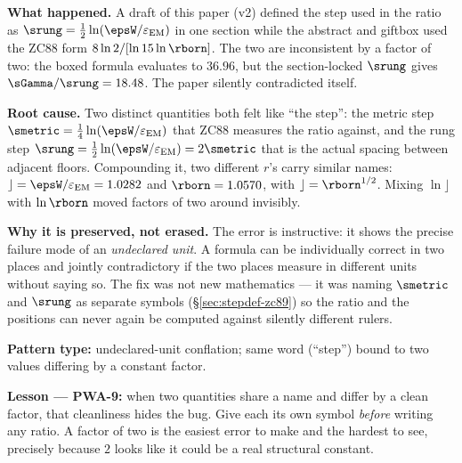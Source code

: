 \documentclass[12pt, a4paper]{article}
\renewcommand{\epsEM}{\varepsilon_{\rm EM}}     %
\begin{document}
\begin{derivedbox}[title={PM-ZC89-FACTOR2-01: The Factor-of-Two
  Unit Conflation --- Caught in Review}]
\textbf{What happened.}
A draft of this paper (v2) defined the step used in the ratio as
$\srung=\tfrac12\ln(\epsW/\epsEM)$ in one section while the abstract and
giftbox used the ZC88 form $8\ln2/[\ln15\ln\rborn]$. The two are
inconsistent by a factor of two: the boxed formula evaluates to $36.96$,
but the section-locked $\srung$ gives $\sGamma/\srung=18.48$. The paper
silently contradicted itself.

\textbf{Root cause.}
Two distinct quantities both felt like ``the step'': the metric step
$\smetric=\tfrac14\ln(\epsW/\epsEM)$ that ZC88 measures the ratio against,
and the rung step $\srung=\tfrac12\ln(\epsW/\epsEM)=2\smetric$ that is the
actual spacing between adjacent floors. Compounding it, two different
$r$'s carry similar names: $\rfloor=\epsW/\epsEM=1.0282$ and
$\rborn=1.0570$, with $\rfloor=\rborn^{1/2}$. Mixing $\ln\rfloor$ with
$\ln\rborn$ moved factors of two around invisibly.

\textbf{Why it is preserved, not erased.}
The error is instructive: it shows the precise failure mode of an
\emph{undeclared unit}. A formula can be individually correct in two places
and jointly contradictory if the two places measure in different units
without saying so. The fix was not new mathematics --- it was naming
$\smetric$ and $\srung$ as separate symbols (\S\ref{sec:stepdef-zc89}) so the
ratio and the positions can never again be computed against silently
different rulers.

\textbf{Pattern type:} undeclared-unit conflation; same word (``step'')
bound to two values differing by a constant factor.

\textbf{Lesson --- PWA-9:} when two quantities share a name and differ by a
clean factor, that cleanliness hides the bug. Give each its own symbol
\emph{before} writing any ratio. A factor of two is the easiest error to
make and the hardest to see, precisely because $2$ looks like it could be a
real structural constant.
\end{derivedbox}
\end{document}
